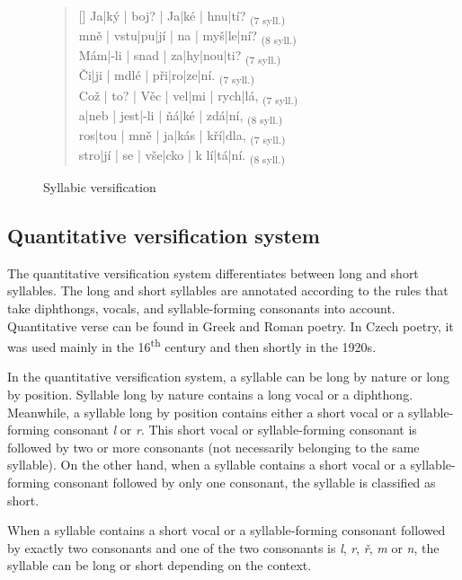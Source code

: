 \begin{figure}[htpb]
    \centering
    \begin{verse}[\versewidth]
    Ja|ký | boj? | Ja|ké | hnu|tí? \textsubscript{(7 syll.)}\\
    mně | vstu|pu|jí | na | myš|le|ní? \textsubscript{(8 syll.)}\\
    Mám|-li | snad | za|hy|nou|ti? \textsubscript{(7 syll.)}\\
    Či|ji | mdlé | při|ro|ze|ní. \textsubscript{(7 syll.)}\\
    Což | to? | Věc | vel|mi | rych|lá, \textsubscript{(7 syll.)}\\
    a|neb | jest|-li | ňá|ké | zdá|ní, \textsubscript{(8 syll.)}\\
    ros|tou | mně | ja|kás | kří|dla, \textsubscript{(7 syll.)}\\
    stro|jí | se | vše|cko | k lí|tá|ní. \textsubscript{(8 syll.)}\\
    \end{verse}
    \caption{Syllabic versification}\label{fig:syllabic-versification}
\end{figure}

\subsection{Quantitative versification system}
The quantitative versification system differentiates between long and short syllables. The long and short syllables are annotated according to the rules that take diphthongs, vocals, and syllable-forming consonants into account. Quantitative verse can be found in Greek and Roman poetry. In Czech poetry, it was used mainly in the 16\textsuperscript{th} century and then shortly in the 1920s.

In the quantitative versification system, a syllable can be long by nature or long by position. Syllable long by nature contains a long vocal or a diphthong. Meanwhile, a syllable long by position contains either a short vocal or a syllable-forming consonant \emph{l} or \emph{r}. This short vocal or syllable-forming consonant is followed by two or more consonants (not necessarily belonging to the same syllable). On the other hand, when a syllable contains a short vocal or a syllable-forming consonant followed by only one consonant, the syllable is classified as short.

When a syllable contains a short vocal or a syllable-forming consonant followed by exactly two consonants and one of the two consonants is \emph{l}, \emph{r}, \emph{ř}, \emph{m} or \emph{n}, the syllable can be long or short depending on the context.

